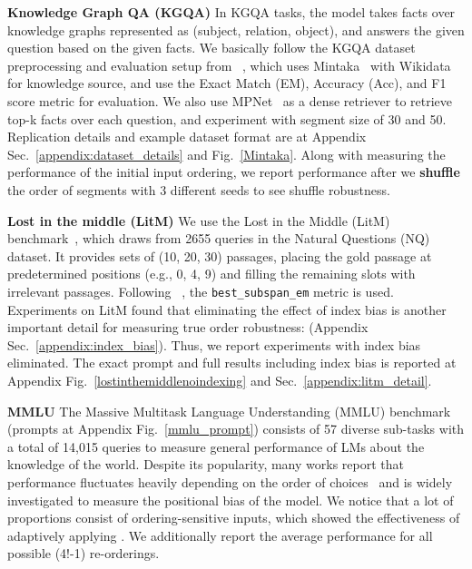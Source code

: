 \noindent \textbf{Knowledge Graph QA (KGQA)} In KGQA tasks, the model takes facts over knowledge graphs represented as (subject, relation, object), and answers the given question based on the given facts. We basically follow the KGQA dataset preprocessing and evaluation setup from ~\citet{baek2023knowledgeaugmentedlanguagemodelverification}, which uses %
Mintaka~\cite{mintaka} with Wikidata for knowledge source, and use the Exact Match (EM), Accuracy (Acc), and F1 score metric for evaluation. We also use MPNet~\cite{song2020mpnetmaskedpermutedpretraining} as a dense retriever to retrieve top-k facts over each question, and experiment with segment size of 30 and 50. Replication details and example dataset format are at Appendix Sec.~\ref{appendix:dataset_details} and Fig.~\ref{Mintaka}. Along with measuring the performance of the initial input ordering, we report performance after we \textbf{shuffle} the order of segments with 3 different seeds to see shuffle robustness.


\noindent \textbf{Lost in the middle (LitM)}
We use the Lost in the Middle (LitM) benchmark~\cite{liu2024lost}, which draws from 2655 queries in the Natural Questions (NQ) dataset. It provides sets of (10, 20, 30) passages, placing the gold passage at predetermined positions (e.g., 0, 4, 9) and filling the remaining slots with irrelevant passages.
Following ~\citet{liu2024lost}, the \texttt{best\_subspan\_em} metric is used. Experiments on LitM found that eliminating the effect of index bias is another important detail for measuring true order robustness: (Appendix Sec.~\ref{appendix:index_bias}). Thus, we report experiments with index bias eliminated. The exact prompt and full results including index bias is reported at Appendix Fig.~\ref{lostinthemiddlenoindexing} and Sec.~\ref{appendix:litm_detail}.

\noindent \textbf{MMLU}
The Massive Multitask Language Understanding (MMLU) benchmark~\cite{hendrycks2021measuringmassivemultitasklanguage} (prompts at Appendix Fig.~\ref{mmlu_prompt}) consists of 57 diverse sub-tasks with a total of 14,015 queries to measure general performance of LMs about the knowledge of the world. Despite its popularity, many works report that performance fluctuates heavily depending on the order of choices~\cite{gupta2024changinganswerorderdecrease, pezeshkpour2023large, wei2024unveilingselectionbiasesexploring, alzahrani2024benchmarkstargetsrevealingsensitivity, zheng2024large} and is widely investigated to measure the positional bias of the model. We notice that a lot of proportions consist of ordering-sensitive inputs, which showed the effectiveness of adaptively applying \sr{}. %
We additionally report the average performance for all possible (4!-1) re-orderings.
